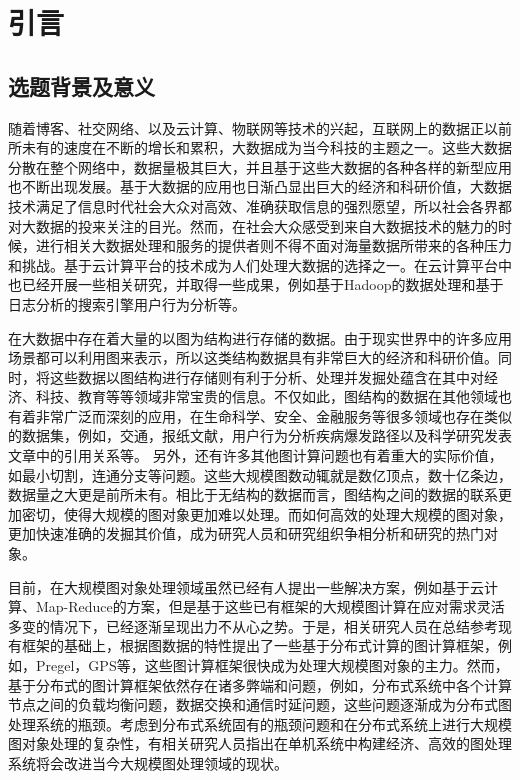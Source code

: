 
\chapter{引言}
\section{选题背景及意义}

随着博客、社交网络、以及云计算、物联网等技术的兴起，互联网上的数据正以前所未有的速度在不断的增长和累积，大数据\cite{liguojie2012,yanxiaofeng2013,taoxuejiao2013,liguojie2012jiazhi,mengxiaofeng2013,wangshan2011jiagoudashuju}成为当今科技的主题之一。这些大数据分散在整个网络中，数据量极其巨大，并且基于这些大数据的各种各样的新型应用也不断出现发展。基于大数据的应用也日渐凸显出巨大的经济和科研价值，大数据技术满足了信息时代社会大众对高效、准确获取信息的强烈愿望，所以社会各界都对大数据的投来关注的目光。然而，在社会大众感受到来自大数据技术的魅力的时候，进行相关大数据处理和服务的提供者则不得不面对海量数据所带来的各种压力和挑战。基于云计算平台的技术\cite{zhangxiangwang2011,yuge2011,yuhuijia2007}成为人们处理大数据的选择之一。在云计算平台中也已经开展一些相关研究，并取得一些成果，例如基于Hadoop的数据处理\cite{zhuzhu2008}和基于日志分析的搜索引擎用户行为分析\cite{yuhuijia2007}等。



在大数据中存在着大量的以图为结构进行存储的数据。由于现实世界中的许多应用场景都可以利用图来表示，所以这类结构数据具有非常巨大的经济和科研价值。同时，将这些数据以图结构进行存储则有利于分析、处理并发掘处蕴含在其中对经济、科技、教育等等领域非常宝贵的信息。不仅如此，图结构的数据在其他领域也有着非常广泛而深刻的应用，在生命科学、安全、金融服务等很多领域也存在类似的数据集，例如，交通，报纸文献，用户行为分析\cite{yuhuijia2007}疾病爆发路径以及科学研究发表文章中的引用关系等。
另外，还有许多其他图计算问题也有着重大的实际价值，如最小切割，连通分支等问题。这些大规模图数动辄就是数亿顶点，数十亿条边，数据量之大更是前所未有。相比于无结构的数据而言，图结构之间的数据的联系更加密切，使得大规模的图对象更加难以处理\cite{lumsdaine2007challenges}。而如何高效的处理大规模的图对象，更加快速准确的发掘其价值，成为研究人员和研究组织争相分析和研究的热门对象。

目前，在大规模图对象处理领域虽然已经有人提出一些解决方案，例如基于云计算\cite{chen2010large}、Map-Reduce\cite{lammel2008google,dean2008mapreduce}的方案，但是基于这些已有框架的大规模图计算在应对需求灵活多变的情况下，已经逐渐呈现出力不从心之势。于是，相关研究人员在总结参考现有框架的基础上，根据图数据的特性提出了一些基于分布式计算的图计算框架，例如，Pregel\cite{malewicz2010pregel}，GPS\cite{salihoglu2013gps}等，这些图计算框架很快成为处理大规模图对象的主力。然而，基于分布式的图计算框架依然存在诸多弊端和问题，例如，分布式系统中各个计算节点之间的负载均衡问题，数据交换和通信时延问题，这些问题逐渐成为分布式图处理系统的瓶颈。考虑到分布式系统固有的瓶颈问题和在分布式系统上进行大规模图对象处理的复杂性，有相关研究人员指出在单机系统中构建经济、高效的图处理系统将会改进当今大规模图处理领域的现状。



